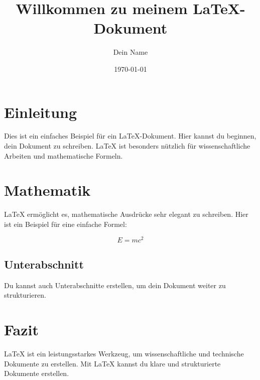 \documentclass{article}
\title{Willkommen zu meinem LaTeX-Dokument}
\author{Dein Name}
\date{\today}
\begin{document}
\maketitle  %

\section{Einleitung}
Dies ist ein einfaches Beispiel für ein LaTeX-Dokument. Hier kannst du beginnen, dein Dokument zu schreiben. LaTeX ist besonders nützlich für wissenschaftliche Arbeiten und mathematische Formeln.

\section{Mathematik}
LaTeX ermöglicht es, mathematische Ausdrücke sehr elegant zu schreiben. Hier ist ein Beispiel für eine einfache Formel:

\[
E = mc^2
\]

\subsection{Unterabschnitt}
Du kannst auch Unterabschnitte erstellen, um dein Dokument weiter zu strukturieren.

\section{Fazit}
LaTeX ist ein leistungsstarkes Werkzeug, um wissenschaftliche und technische Dokumente zu erstellen. Mit LaTeX kannst du klare und strukturierte Dokumente erstellen.
\end{document}
